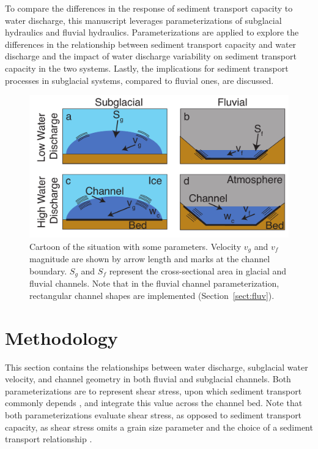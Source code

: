 \documentclass[11pt]{article}
\begin{document}
\begin{spacing}{1}
  To compare the differences in the response of sediment transport capacity to water discharge, this manuscript leverages parameterizations of subglacial hydraulics and fluvial hydraulics.
  Parameterizations are applied to explore the differences in the relationship between sediment transport capacity and water discharge and the impact of water discharge variability on sediment transport capacity in the two systems.
  Lastly, the implications for sediment transport processes in subglacial systems, compared to fluvial ones, are discussed.

  \begin{center}
    \begin{figure}[H]
      \includegraphics[width=0.9\linewidth]{Cartoon.pdf}
      \caption{Cartoon of the situation with some parameters. Velocity $v_g$ and $v_f$ magnitude are shown by arrow length and marks at the channel boundary. $S_g$ and $S_f$ represent the cross-sectional area in glacial and fluvial channels.  Note that in the fluvial channel parameterization, rectangular channel shapes are implemented (Section~\ref{sect:fluv}).} 
      \label{fig:cartoon}
    \end{figure}
  \end{center}
  
  \section{Methodology}
  \label{sect:meth}
  This section contains the relationships between water discharge, subglacial water velocity, and channel geometry in both fluvial and subglacial channels.
  Both parameterizations are to represent shear stress, upon which sediment transport commonly depends \citep[][]{shields1936}, and integrate this value across the channel bed.
  Note that both parameterizations evaluate shear stress, as opposed to sediment transport capacity, as shear stress omits a grain size parameter and the choice of a sediment transport relationship \citep{shields1936}.
  

\end{spacing}
\end{document}
